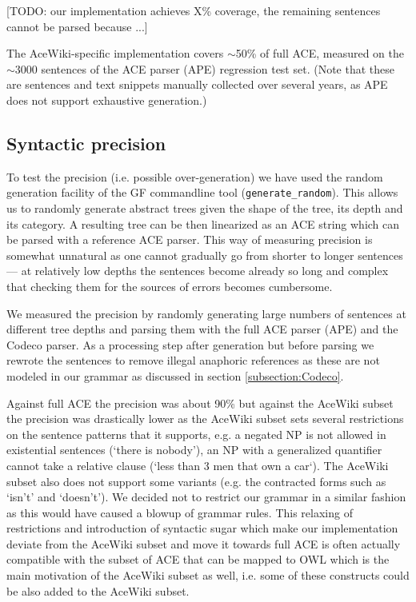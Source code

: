 \documentclass[a4paper]{article}
\begin{document}
[TODO: our implementation achieves X\% coverage, the remaining sentences
cannot be parsed because ...]

The AceWiki-specific implementation covers $\sim$50\% of full ACE, measured
on the $\sim$3000 sentences of the ACE parser (APE) regression test set.
(Note that these are sentences and text snippets manually collected over
several years, as APE does not support exhaustive generation.)

\subsection{Syntactic precision}

To test the precision (i.e. possible over-generation) we have used the
random generation facility of the GF commandline tool
(\verb!generate_random!). This allows us to randomly generate abstract trees
given the shape of the tree, its depth and its category. A resulting tree
can be then linearized as an ACE string which can be parsed with a
reference ACE parser.
This way of measuring precision is somewhat unnatural as one cannot gradually
go from shorter to longer sentences --- at relatively low depths the
sentences become already so long and complex that checking them for the
sources of errors becomes cumbersome.

We measured the precision by randomly generating large numbers of sentences
at different tree depths and parsing them with the full ACE parser (APE) and
the Codeco parser. As
a processing step after generation but before parsing we rewrote the sentences
to remove illegal anaphoric references as these are not
modeled in our grammar as discussed in section \ref{subsection:Codeco}.

Against full ACE the precision was about 90\% but against the AceWiki subset
the precision was drastically lower as the AceWiki subset sets several
restrictions on the sentence patterns that it supports, e.g. a negated
NP is not allowed in existential sentences (`there is nobody'),
an NP with a generalized quantifier cannot take a relative clause
(`less than 3 men that own a car`). The AceWiki subset also does not support
some variants (e.g. the contracted forms such as `isn't' and `doesn't').
We decided not to restrict our grammar in a similar fashion as this would
have caused a blowup of grammar rules. This relaxing of restrictions and
introduction of syntactic sugar which make our
implementation deviate from the AceWiki subset and move it towards full ACE
is often actually compatible with the subset of ACE that can be mapped to OWL
which is the main motivation of the AceWiki subset as well, i.e. some of
these constructs could be also added to the AceWiki subset.
\end{document}
